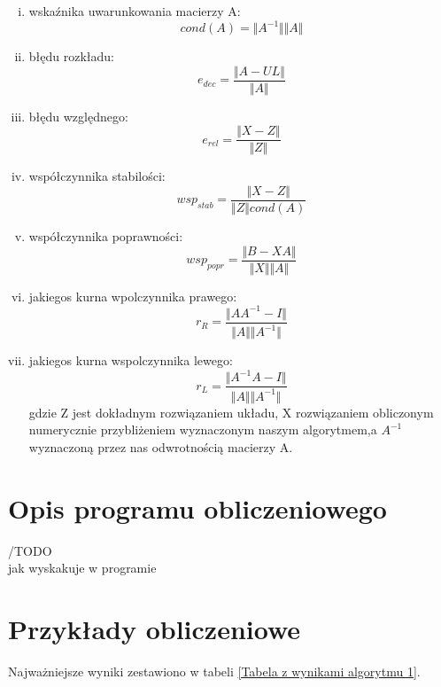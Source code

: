 \documentclass[12pt]{article}
\begin{document}
\begin{enumerate}[i)]
\item wska\'znika uwarunkowania macierzy A:
\[
cond(A)=\Vert A^{-1}\Vert  \Vert A \Vert
\]
\item b\l{}\k{e}du rozk\l{}adu:
\[
e_{dec}=\frac{\Vert A-UL \Vert}{\Vert A \Vert}
\]
\item b\l{}\k{e}du wzgl\k{e}dnego:
\[
e_{rel}=\frac{\Vert X-Z \Vert}{\Vert Z \Vert}
\]
\item wsp\'o\l{}czynnika stabilo\'sci:
\[
wsp_{stab}=\frac{\Vert X-Z \Vert}{\Vert Z \Vert cond(A)}
\]
\item wsp\'o\l{}czynnika poprawno\'sci:
\[
wsp_{popr}=\frac{\Vert B-XA \Vert}{\Vert X \Vert \Vert A \Vert}
\]
\item jakiegos kurna wpolczynnika prawego:
\[
r_{R}=\frac{\Vert AA^{-1}-I\Vert}{\Vert A \Vert \Vert A^{-1} \Vert}
\]
\item jakiegos kurna wspolczynnika lewego:
\[
r_{L}=\frac{\Vert A^{-1}A-I\Vert}{\Vert A \Vert \Vert A^{-1} \Vert}
\]
gdzie Z jest dok\l{}adnym rozwi\k{a}zaniem uk\l{}adu, X rozwi\k{a}zaniem obliczonym numerycznie przybli\.zeniem wyznaczonym naszym algorytmem,a $A^{-1}$ wyznaczon\k{a} przez nas odwrotno\'sci\k{a} macierzy A. 


\end{enumerate}

\vskip20pt

\section{Opis programu obliczeniowego}


/TODO
\\
jak wyskakuje w programie

\vskip20pt

\section{Przyk\l ady obliczeniowe}

\noindent 

Najwa\.zniejsze wyniki zestawiono w tabeli \ref{Tabela z wynikami algorytmu 1}.

\bigskip
\end{document}

